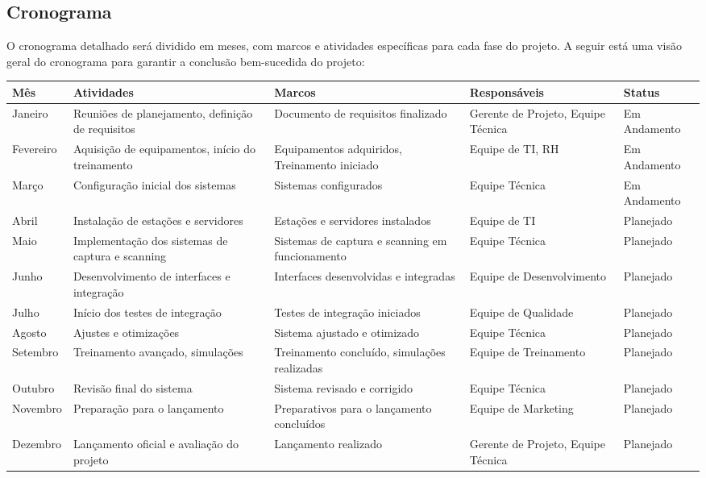 \subsection{Cronograma}
O cronograma detalhado será dividido em meses, com marcos e atividades específicas para cada fase do projeto. A seguir está uma visão geral do cronograma para garantir a conclusão bem-sucedida do projeto:


\begin{table}[H]
\centering
\begin{tabular}{|p{2cm}|p{4cm}|p{3cm}|p{3cm}|p{2cm}|}
\hline
\textbf{Mês} & \textbf{Atividades} & \textbf{Marcos} & \textbf{Responsáveis} & \textbf{Status} \\ \hline
Janeiro & Reuniões de planejamento, definição de requisitos & Documento de requisitos finalizado & Gerente de Projeto, Equipe Técnica & Em Andamento \\ \hline
Fevereiro & Aquisição de equipamentos, início do treinamento & Equipamentos adquiridos, Treinamento iniciado & Equipe de TI, RH & Em Andamento \\ \hline
Março & Configuração inicial dos sistemas & Sistemas configurados & Equipe Técnica & Em Andamento \\ \hline
Abril & Instalação de estações e servidores & Estações e servidores instalados & Equipe de TI & Planejado \\ \hline
Maio & Implementação dos sistemas de captura e scanning & Sistemas de captura e scanning em funcionamento & Equipe Técnica & Planejado \\ \hline
Junho & Desenvolvimento de interfaces e integração & Interfaces desenvolvidas e integradas & Equipe de Desenvolvimento & Planejado \\ \hline
Julho & Início dos testes de integração & Testes de integração iniciados & Equipe de Qualidade & Planejado \\ \hline
Agosto & Ajustes e otimizações & Sistema ajustado e otimizado & Equipe Técnica & Planejado \\ \hline
Setembro & Treinamento avançado, simulações & Treinamento concluído, simulações realizadas & Equipe de Treinamento & Planejado \\ \hline
Outubro & Revisão final do sistema & Sistema revisado e corrigido & Equipe Técnica & Planejado \\ \hline
Novembro & Preparação para o lançamento & Preparativos para o lançamento concluídos & Equipe de Marketing & Planejado \\ \hline
Dezembro & Lançamento oficial e avaliação do projeto & Lançamento realizado & Gerente de Projeto, Equipe Técnica & Planejado \\ \hline

\end{tabular}
\end{table}
